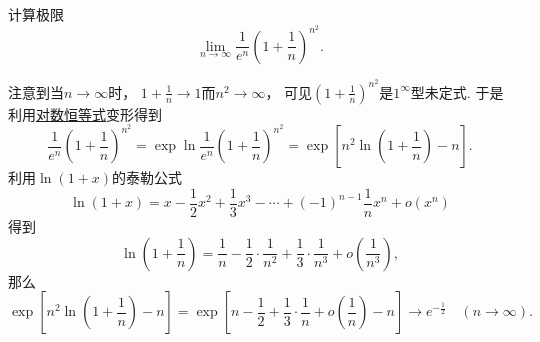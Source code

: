 \begin{example}
计算极限\begin{equation*}
	\lim_{n\to\infty} \frac{1}{e^n} \left(1+\frac{1}{n}\right)^{n^2}.
\end{equation*}
\begin{solution}
注意到当\(n\to\infty\)时，
\(1+\frac1n\to1\)而\(n^2\to\infty\)，
可见\(\left(1+\frac{1}{n}\right)^{n^2}\)是\(1^\infty\)型未定式.
于是利用\hyperref[equation:函数.对数恒等式]{对数恒等式}变形得到\begin{equation*}
	\frac{1}{e^n} \left(1+\frac{1}{n}\right)^{n^2}
	= \exp\ln\frac{1}{e^n} \left(1+\frac{1}{n}\right)^{n^2}
	= \exp[ n^2 \ln(1+\frac{1}{n}) - n ].
\end{equation*}
利用\(\ln(1+x)\)的泰勒公式\begin{equation*}
	\ln(1+x)
	= x - \frac{1}{2} x^2 + \frac{1}{3} x^3 - \dotsb
		+ (-1)^{n-1} \frac{1}{n} x^n + o(x^n)
\end{equation*}得到\begin{equation*}
	\ln(1+\frac1n)
	= \frac1n - \frac12\cdot\frac1{n^2} + \frac13\cdot\frac1{n^3}
	+ o\left( \frac1{n^3} \right),
\end{equation*}
那么\begin{equation*}
	\exp[ n^2 \ln(1+\frac{1}{n}) - n ]
	= \exp[
		n - \frac12 + \frac13\cdot\frac1n + o\left( \frac1n \right)
		- n
	]
	\to e^{-\frac12}
	\quad(n\to\infty).
\end{equation*}
\end{solution}
\end{example}

